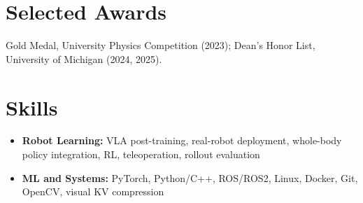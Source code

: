 \documentclass[11pt,letterpaper]{article}
\newcommand{\resumeItem}[1]{
    \item #1
}
\begin{document}
\section*{Selected Awards}
\small Gold Medal, University Physics Competition (2023); Dean's Honor List, University of Michigan (2024, 2025).
\section*{Skills}
\begin{itemize}[leftmargin=2.4em, itemsep=0.5pt, topsep=0pt]
\small
\resumeItem{\textbf{Robot Learning:} VLA post-training, real-robot deployment, whole-body policy integration, RL, teleoperation, rollout evaluation}
\resumeItem{\textbf{ML and Systems:} PyTorch, Python/C++, ROS/ROS2, Linux, Docker, Git, OpenCV, visual KV compression}
\end{itemize}
\end{document}
